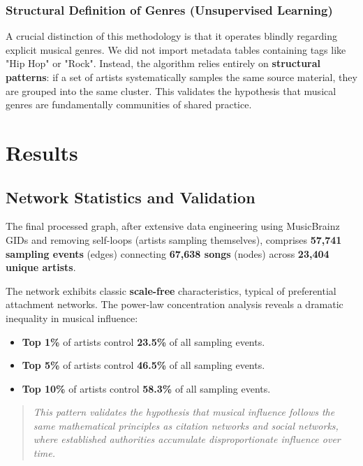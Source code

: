 \documentclass[a4paper, 12pt]{article}
\begin{document}
\subsubsection{Structural Definition of Genres (Unsupervised Learning)}
A crucial distinction of this methodology is that it operates blindly regarding explicit musical genres. We did not import metadata tables containing tags like "Hip Hop" or "Rock". Instead, the algorithm relies entirely on \textbf{structural patterns}: if a set of artists systematically samples the same source material, they are grouped into the same cluster. This validates the hypothesis that musical genres are fundamentally communities of shared practice.

\clearpage

\section{Results}

\subsection{Network Statistics and Validation}
The final processed graph, after extensive data engineering using MusicBrainz GIDs and removing self-loops (artists sampling themselves), comprises \textbf{57,741 sampling events} (edges) connecting \textbf{67,638 songs} (nodes) across \textbf{23,404 unique artists}.

The network exhibits classic \textbf{scale-free} characteristics, typical of preferential attachment networks. The power-law concentration analysis reveals a dramatic inequality in musical influence:

\begin{itemize}
    \item \textbf{Top 1\%} of artists control \textbf{23.5\%} of all sampling events.
    \item \textbf{Top 5\%} of artists control \textbf{46.5\%} of all sampling events.
    \item \textbf{Top 10\%} of artists control \textbf{58.3\%} of all sampling events.
\end{itemize}

\begin{quote}
    \textit{This pattern validates the hypothesis that musical influence follows the same mathematical principles as citation networks and social networks, where established authorities accumulate disproportionate influence over time.}
\end{quote}
\end{document}
